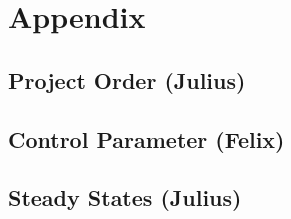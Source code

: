\chapter{Appendix}
\section{Project Order (Julius)}
\section{Control Parameter (Felix)}
\section{Steady States (Julius)}

